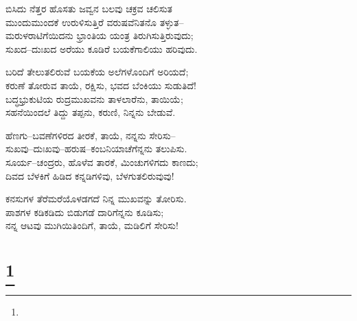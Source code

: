 \begin{myquote}
ಬಿಸಿದು ನೆತ್ತರ ಹೊಸತು ಜವ್ವನ ಬಲವು ಚಕ್ರವ ಚಲಿಸುತ\\ಮುಂದುಮುಂದಕೆ ಉರುಳಿಸುತ್ತಿರೆ ವರುಷವೆನಿತನೊ ತಳ್ಳುತ–\\ಮರುಳರಾಟಿಗೆಯಿದನು ಭ್ರಾಂತಿಯ ಯಂತ್ರ ತಿರುಗಿಸುತ್ತಿರುವುದು;\\ಸುಖದ–ದುಃಖದ ಅರೆಯು ಕೂಡಿರೆ ಬಯಕೆಗಾಲಿಯು ಹರಿವುದು.
\end{myquote}

\begin{myquote}
ಬರಿದೆ ತೇಲುತಲಿರುವೆ ಬಯಕೆಯ ಅಲೆಗಳೊಂದಿಗೆ ಅರಿಯದೆ;\\ಕರುಣೆ ತೋರುವ ತಾಯೆ, ರಕ್ಷಿಸು, ಭವದ ಬೆಂಕಿಯು ಸುಡುತಿದೆ!\\ಬದ್ಧಭ್ರುಕುಟಿಯ ರುದ್ರಮುಖವನು ತಾಳಲಾರೆನು, ತಾಯಿಯೆ;\\ಸಹನೆಯಿಂದಲೆ ತಿದ್ದು ತಪ್ಪನು, ಕರುಣಿ, ನಿನ್ನನು ಬೇಡುವೆ.
\end{myquote}

\begin{myquote}
ಹೆಣಗು–ಬವಣೆಗಳಿರದ ತೀರಕೆ, ತಾಯೆ, ನನ್ನನು ಸೇರಿಸು–\\ಸುಖವು–ದುಃಖವು–ಹರುಷ–ಕಂಬನಿಯಾಚೆಗೆನ್ನನು ತಲುಪಿಸು.\\ಸೂರ್ಯ–ಚಂದ್ರರು, ಹೊಳೆವ ತಾರಕೆ, ಮಿಂಚುಗಳಿಗದು ಕಾಣದು;\\ದಿವದ ಬೆಳಕಿಗೆ ಹಿಡಿದ ಕನ್ನಡಿಗಳಿವು, ಬೆಳಗುತಲಿರುವುವು!
\end{myquote}

\begin{myquote}
ಕನಸುಗಳ ತೆರೆಮರೆಯೊಳಡಗದೆ ನಿನ್ನ ಮುಖವನ್ನು ತೋರಿಸು.\\ಪಾಶಗಳ ಕಡಿಕಡಿದು ಬಿಡುಗಡೆ ದಾರಿಗೆನ್ನನು ಕೂಡಿಸು;\\ನನ್ನ ಆಟವು ಮುಗಿಯಿತಿಂದಿಗೆ, ತಾಯೆ, ಮಡಿಲಿಗೆ ಸೇರಿಸು!
\end{myquote}

\selecteng

\chapter[PEACE]{\protect\footnote{}}

\begin{myquote}
\end{myquote}

\begin{myquote}
\end{myquote}

